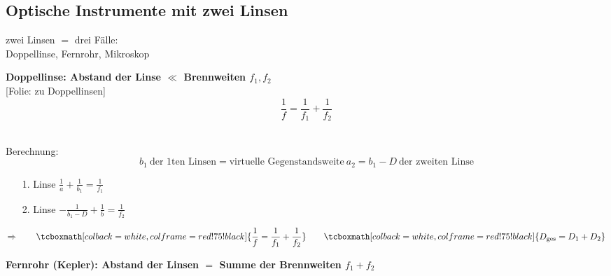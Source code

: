 \documentclass[titlepage,11pt,a4paper,ngerman]{report}
\newcommand{\tx}[1]{\textrm{#1}}
\newcommand{\folie}[1]{\color{gray}[Folie: #1]\color{black}}
\newcommand{\rmbox}[1]{\tcboxmath[colback=white,colframe=red!75!black]{#1}}
\begin{document}
\subsection{Optische Instrumente mit zwei Linsen}

zwei Linsen $ = $ drei Fälle:\\[5pt]
Doppellinse, Fernrohr, Mikroskop\\[5pt]
\begin{enumerate}[1)]
	\begin{minipage}{.7\linewidth}
		\item \textbf{Doppellinse: Abstand der Linse $ \ll $ Brennweiten $ f_1,f_2 $}\\
		\folie{zu Doppellinsen}
		\begin{equation*}
		\frac{1}{f} = \frac{1}{f_1} + \frac{1}{f_2}
		\end{equation*}
	\end{minipage}%
	\begin{minipage}{.3\linewidth}
		\centering
	\end{minipage}%
	\\
	Berechnung:
	\begin{equation*}
	b_1 \ \tx{der 1ten Linsen} = \tx{virtuelle Gegenstandsweite} \ a_2 = b_1 - D \ \tx{der zweiten Linse}
	\end{equation*}
	\begin{itemize}
		\item[1. Linse] $ \frac{1}{a} + \frac{1}{b_1} = \frac{1}{f_1} $
		\item[2. Linse] $ -\frac{1}{b_1 - D} + \frac{1}{b} = \frac{1}{f_2} $
	\end{itemize}
	\begin{equation*}
	\Rightarrow \qquad \rmbox{\frac{1}{f} = \frac{1}{f_1} + \frac{1}{f_2}} \qquad \rmbox{D_{\tx{ges}} = D_1 + D_2}
	\end{equation*}
	\item \textbf{Fernrohr (Kepler): Abstand der Linsen $ = $ Summe der Brennweiten $ f_1 + f_2 $}\\

\end{enumerate}
\end{document}
